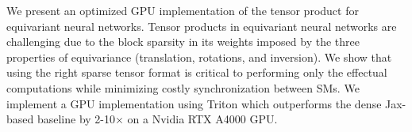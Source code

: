 We present an optimized GPU implementation of the tensor product for equivariant neural networks. Tensor products in equivariant neural networks are challenging due to the block sparsity in its weights imposed by the three properties of equivariance (translation, rotations, and inversion). We show that using the right sparse tensor format is critical to performing only the effectual computations while minimizing costly synchronization between SMs. We implement a GPU implementation using Triton which outperforms the dense Jax-based baseline by 2-10$\times$ on a Nvidia RTX A4000 GPU.
